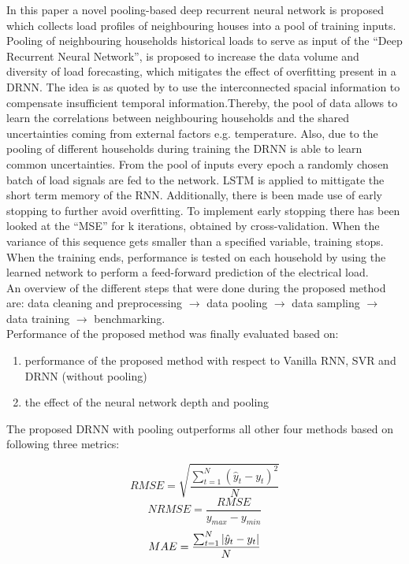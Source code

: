 In this paper \cite{Shi2018} a novel pooling-based deep recurrent neural network is proposed which collects load profiles of neighbouring houses into a pool of training inputs. Pooling of neighbouring households historical loads to serve as input of the ``Deep Recurrent Neural Network'', is proposed to increase the data volume and diversity of load forecasting, which mitigates the effect of overfitting present in a DRNN. The idea is as quoted by \cite{Shi2018} to use the interconnected spacial information to compensate insufficient temporal information.Thereby, the pool of data allows to learn the correlations between neighbouring households and the shared uncertainties coming from external factors e.g. temperature.  Also, due to the pooling of different households during training the DRNN is able to learn common uncertainties. From the pool of inputs every epoch a randomly chosen batch of load signals are fed to the network. LSTM is applied to mittigate the short term memory of the RNN. Additionally, there is been made use of early stopping to further avoid overfitting. To implement early stopping there has been looked at the ``MSE'' for k iterations, obtained by cross-validation. When the variance of this sequence gets smaller than a specified variable, training stops. When the training ends, performance is tested on each household by using the learned network to perform a feed-forward prediction of the electrical load.\\

An overview of the different steps that were done during the proposed method are: data cleaning and preprocessing $\rightarrow$ data pooling $\rightarrow$ data sampling $\rightarrow$ data training $\rightarrow$ benchmarking.\\

Performance of the proposed method was finally evaluated based on: 
\begin{enumerate}
	\item performance of the proposed method with respect to Vanilla RNN, SVR and DRNN (without pooling)
	\item the effect of the neural network depth and pooling
\end{enumerate}

The proposed DRNN with pooling outperforms all other four methods based on following three metrics:

\begin{equation}
	RMSE = \sqrt{\frac{\sum_{t=1}^{N}(\hat{y}_t-y_t)^2}{N}}
\end{equation}
\begin{equation}
	NRMSE = \frac{RMSE}{y_{max}-y_{min}}
\end{equation}
\begin{equation}
	MAE = \frac{\sum_{t=1}^{N}\abs{\hat{y}_t-y_t}}{N}
\end{equation}

